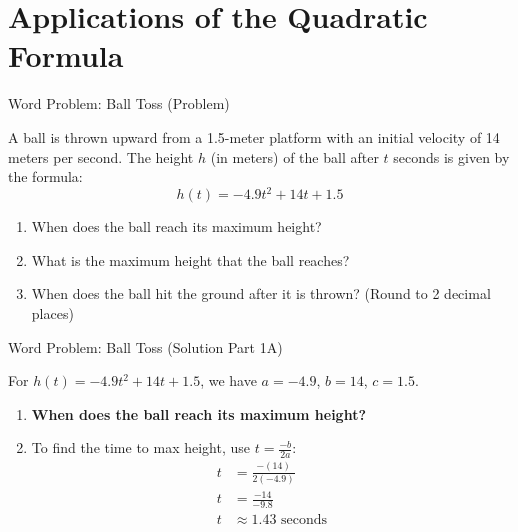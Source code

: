 \documentclass[aspectratio=169]{beamer}
\begin{document}
\section{Applications of the Quadratic Formula}

\begin{frame}{Word Problem: Ball Toss (Problem)}
    \begin{tcolorbox}[colback=lightgray,colframe=primary,title=Problem]
        \footnotesize
        A ball is thrown upward from a 1.5-meter platform with an initial velocity of 14 meters per second. The height $h$ (in meters) of the ball after $t$ seconds is given by the formula:
        \[ h(t) = -4.9t^2 + 14t + 1.5 \]
        \begin{enumerate}
            \item When does the ball reach its maximum height?
            \item What is the maximum height that the ball reaches?
            \item When does the ball hit the ground after it is thrown? (Round to 2 decimal places)
        \end{enumerate}
    \end{tcolorbox}
\end{frame}

\begin{frame}{Word Problem: Ball Toss (Solution Part 1A)}
    \begin{tcolorbox}[colback=lightgray,colframe=accent,title=Solution Part 1A: Max Height Time]
        \footnotesize
        For $h(t) = -4.9t^2 + 14t + 1.5$, we have $a=-4.9$, $b=14$, $c=1.5$.
        \begin{enumerate}
            \item \textbf{When does the ball reach its maximum height?}
            \item To find the time to max height, use $t = \frac{-b}{2a}$:
                \begin{align*}
                    t &= \frac{-(14)}{2(-4.9)} \\
                    t &= \frac{-14}{-9.8} \\
                    t &\approx 1.43 \text{ seconds}
                \end{align*}
        \end{enumerate}
    \end{tcolorbox}
\end{frame}
\end{document}
